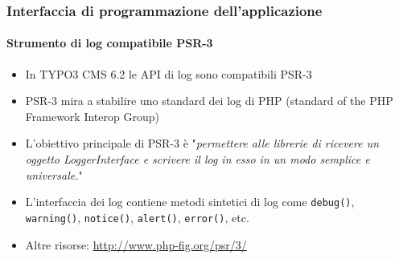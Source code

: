 \begin{frame}[fragile]
	\frametitle{Interfaccia di programmazione dell'applicazione}
	\framesubtitle{Strumento di log compatibile PSR-3}

	\begin{itemize}
		\item In TYPO3 CMS 6.2 le API di log sono compatibili PSR-3
		\item PSR-3 mira a stabilire uno standard dei log di PHP (standard of the PHP Framework Interop Group)

		\item L'obiettivo principale di PSR-3 è
			"\emph{permettere alle librerie di ricevere un oggetto LoggerInterface e scrivere il log in esso in un modo semplice e universale.}"

		\item L'interfaccia dei log contiene metodi sintetici di log come\newline
			\texttt{debug()}, \texttt{warning()}, \texttt{notice()}, \texttt{alert()}, \texttt{error()}, etc.

		\item Altre risorse:\newline
			\url{http://www.php-fig.org/psr/3/}

	\end{itemize}

\end{frame}


